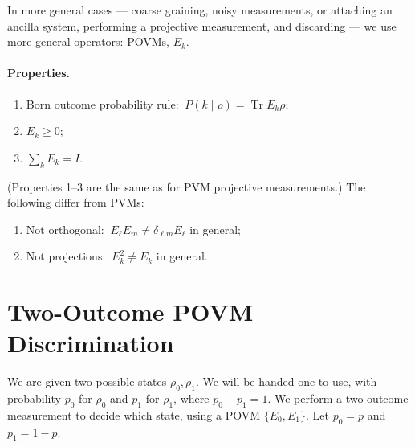 \documentclass[11pt]{article}
\newcommand{\Tr}{\operatorname{Tr}}
\begin{document}
In more general cases --- coarse graining, noisy measurements, or attaching an
ancilla system, performing a projective measurement, and discarding --- we use
more general operators: POVMs, $E_k$.

\paragraph{Properties.}
\begin{enumerate}[label=(\arabic*), nosep]
  \item Born outcome probability rule: $\ P(k\mid\rho) = \Tr E_k\rho$;
  \item $E_k \ge 0$;
  \item $\displaystyle\sum_k E_k = I$.
\end{enumerate}
(Properties 1--3 are the same as for PVM projective measurements.) The
following differ from PVMs:
\begin{enumerate}[label=(\arabic*), start=4, nosep]
  \item Not orthogonal: $\ E_\ell E_m \neq \delta_{\ell m} E_\ell$ in general;
  \item Not projections: $\ E_k^{2} \neq E_k$ in general.
\end{enumerate}

\section{Two-Outcome POVM Discrimination}

We are given two possible states $\rho_0,\rho_1$. We will be handed one to use,
with probability $p_0$ for $\rho_0$ and $p_1$ for $\rho_1$, where $p_0+p_1=1$.
We perform a two-outcome measurement to decide which state, using a POVM
$\{E_0,E_1\}$. Let $p_0=p$ and $p_1=1-p$.
\end{document}

